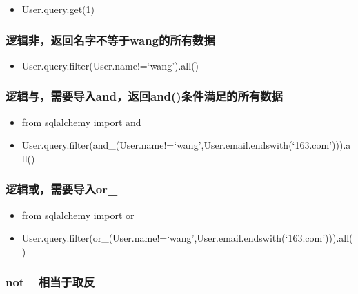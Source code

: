 \documentclass[11pt]{article}
\providecommand{\tightlist}{%
      \setlength{\itemsep}{0pt}\setlength{\parskip}{0pt}}
\begin{document}
\begin{itemize}
\tightlist
\item
  User.query.get(1)
\end{itemize}

\hypertarget{ux903bux8f91ux975eux8fd4ux56deux540dux5b57ux4e0dux7b49ux4e8ewangux7684ux6240ux6709ux6570ux636e}{%
\subsubsection{逻辑非，返回名字不等于wang的所有数据}\label{ux903bux8f91ux975eux8fd4ux56deux540dux5b57ux4e0dux7b49ux4e8ewangux7684ux6240ux6709ux6570ux636e}}

\begin{itemize}
\tightlist
\item
  User.query.filter(User.name!=`wang').all()
\end{itemize}

\hypertarget{ux903bux8f91ux4e0eux9700ux8981ux5bfcux5165andux8fd4ux56deandux6761ux4ef6ux6ee1ux8db3ux7684ux6240ux6709ux6570ux636e}{%
\subsubsection{逻辑与，需要导入and，返回and()条件满足的所有数据}\label{ux903bux8f91ux4e0eux9700ux8981ux5bfcux5165andux8fd4ux56deandux6761ux4ef6ux6ee1ux8db3ux7684ux6240ux6709ux6570ux636e}}

\begin{itemize}
\tightlist
\item
  from sqlalchemy import and\_
\item
  User.query.filter(and\_(User.name!=`wang',User.email.endswith(`163.com'))).all()
\end{itemize}

\hypertarget{ux903bux8f91ux6216ux9700ux8981ux5bfcux5165or_}{%
\subsubsection{逻辑或，需要导入or\_}\label{ux903bux8f91ux6216ux9700ux8981ux5bfcux5165or_}}

\begin{itemize}
\tightlist
\item
  from sqlalchemy import or\_
\item
  User.query.filter(or\_(User.name!=`wang',User.email.endswith(`163.com'))).all()
\end{itemize}

\hypertarget{not_-ux76f8ux5f53ux4e8eux53d6ux53cd}{%
\subsubsection{not\_
相当于取反}\label{not_-ux76f8ux5f53ux4e8eux53d6ux53cd}}
\end{document}
